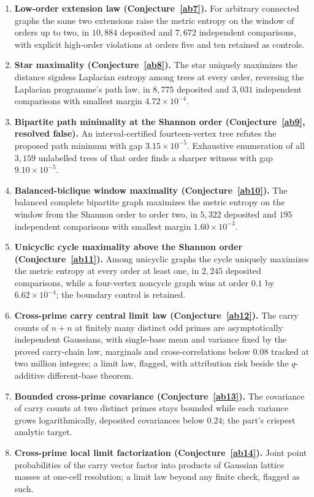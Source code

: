\documentclass[11pt]{article}
\theoremstyle{definition}
\begin{document}
\begin{enumerate}
\item \textbf{Low-order extension law (Conjecture~\ref{ab7}).}  For arbitrary connected graphs the same two extensions raise the metric entropy on the window of orders up to two, in $10{,}884$ deposited and $7{,}672$ independent comparisons, with explicit high-order violations at orders five and ten retained as controls.
\item \textbf{Star maximality (Conjecture~\ref{ab8}).}  The star uniquely maximizes the distance signless Laplacian entropy among trees at every order, reversing the Laplacian programme's path law, in $8{,}775$ deposited and $3{,}031$ independent comparisons with smallest margin $4.72\times10^{-4}$.
\item \textbf{Bipartite path minimality at the Shannon order (Conjecture~\ref{ab9}, resolved false).}  An interval-certified fourteen-vertex tree refutes the proposed path minimum with gap $3.15\times10^{-5}$.  Exhaustive enumeration of all $3{,}159$ unlabelled trees of that order finds a sharper witness with gap $9.10\times10^{-5}$.
\item \textbf{Balanced-biclique window maximality (Conjecture~\ref{ab10}).}  The balanced complete bipartite graph maximizes the metric entropy on the window from the Shannon order to order two, in $5{,}322$ deposited and $195$ independent comparisons with smallest margin $1.60\times10^{-3}$.
\item \textbf{Unicyclic cycle maximality above the Shannon order (Conjecture~\ref{ab11}).}  Among unicyclic graphs the cycle uniquely maximizes the metric entropy at every order at least one, in $2{,}245$ deposited comparisons, while a four-vertex noncycle graph wins at order $0.1$ by $6.62\times10^{-4}$; the boundary control is retained.
\item \textbf{Cross-prime carry central limit law (Conjecture~\ref{ab12}).}  The carry counts of $n+n$ at finitely many distinct odd primes are asymptotically independent Gaussians, with single-base mean and variance fixed by the proved carry-chain law, marginals and cross-correlations below $0.08$ tracked at two million integers; a limit law, flagged, with attribution risk beside the $q$-additive different-base theorem.
\item \textbf{Bounded cross-prime covariance (Conjecture~\ref{ab13}).}  The covariance of carry counts at two distinct primes stays bounded while each variance grows logarithmically, deposited covariances below $0.24$; the part's crispest analytic target.
\item \textbf{Cross-prime local limit factorization (Conjecture~\ref{ab14}).}  Joint point probabilities of the carry vector factor into products of Gaussian lattice masses at one-cell resolution; a limit law beyond any finite check, flagged as such.

\end{enumerate}
\end{document}
